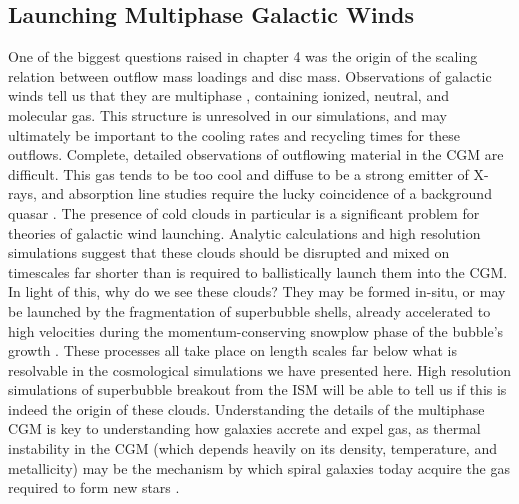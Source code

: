 \subsection{Launching Multiphase Galactic Winds}
One of the biggest questions raised in chapter 4 was the origin of the scaling
relation between outflow mass loadings and disc mass.  Observations of galactic
winds tell us that they are multiphase \citep{Stark1984,Wakker1997}, containing
ionized, neutral, and molecular gas.  This structure is unresolved in our
simulations, and may ultimately be important to the cooling rates and recycling
times for these outflows.  Complete, detailed observations of outflowing
material in the CGM are difficult. This gas tends to be too cool and diffuse to
be a strong emitter of X-rays, and absorption line studies require the lucky
coincidence of a background quasar \citep{Weiner2009}.  The presence of cold
clouds in particular is a significant problem for theories of galactic wind
launching.  Analytic calculations and high resolution simulations suggest that
these clouds should be disrupted and mixed on timescales far shorter than is
required to ballistically launch them into the CGM.  In light of this, why do we
see these clouds?  They may be formed in-situ, or may be launched by the
fragmentation of superbubble shells, already accelerated to high velocities
during the momentum-conserving snowplow phase of the bubble's growth
\citep{Lagos2013}.  These processes all take place on length scales far below
what is resolvable in the cosmological simulations we have presented here.  High
resolution simulations of superbubble breakout from the ISM will be able to tell
us if this is indeed the origin of these clouds.  Understanding the details of
the multiphase CGM is key to understanding how galaxies accrete and expel gas,
as thermal instability in the CGM (which depends heavily on its density,
temperature, and metallicity) may be the mechanism by which spiral galaxies
today acquire the gas required to form new stars \citep{Marasco2012}.  

